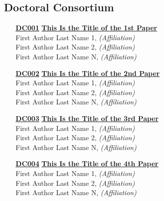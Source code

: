 \subsection{Doctoral Consortium}
\begin{enumerate}
\item[\href{https://doi.org/10.1145/1122445.1122456}{\textbf{DC001}}]
\href{https://doi.org/10.1145/1122445.1122456}{\textbf{This Is the Title of the 1st Paper}}\\
First Author Last Name 1, \emph{(Affiliation)}\\
First Author Last Name 2, \emph{(Affiliation)}\\
First Author Last Name N, \emph{(Affiliation)}\\

\item[\href{https://doi.org/10.1145/1122445.1122456}{\textbf{DC002}}]
\href{https://doi.org/10.1145/1122445.1122456}{\textbf{This Is the Title of the 2nd Paper}}\\
First Author Last Name 1, \emph{(Affiliation)}\\
First Author Last Name 2, \emph{(Affiliation)}\\
First Author Last Name N, \emph{(Affiliation)}\\

\item[\href{https://doi.org/10.1145/1122445.1122456}{\textbf{DC003}}]
\href{https://doi.org/10.1145/1122445.1122456}{\textbf{This Is the Title of the 3rd Paper}}\\
First Author Last Name 1, \emph{(Affiliation)}\\
First Author Last Name 2, \emph{(Affiliation)}\\
First Author Last Name N, \emph{(Affiliation)}\\

\item[\href{https://doi.org/10.1145/1122445.1122456}{\textbf{DC004}}]
\href{https://doi.org/10.1145/1122445.1122456}{\textbf{This Is the Title of the 4th Paper}}\\
First Author Last Name 1, \emph{(Affiliation)}\\
First Author Last Name 2, \emph{(Affiliation)}\\
First Author Last Name N, \emph{(Affiliation)}\\
\end{enumerate}


